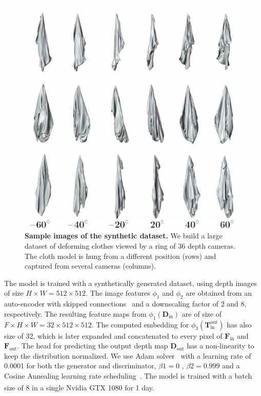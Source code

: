 \begin{figure}
    \centering
    \includegraphics[width=\linewidth]{main/chapter04/data/ipalm_cvpr_grid_dataset_synth.pdf}
    \caption[Sample images of the synthetic dataset]{{\bf Sample images of the synthetic dataset.} We build a large dataset of deforming clothes viewed by a ring of 36 depth cameras. The cloth model is hung from a different position (rows) and captured from several cameras (columns).}
    \label{fig_setup_cameras}
\end{figure}

The model is trained with a synthetically generated dataset, using depth images of size $H \times W = 512 \times 512$. The image features $\phi_1$ and $\phi_2$ are obtained from an auto-encoder with skipped connections~\cite{pix2pix2017} and a downscaling factor of 2 and 8, respectively. The resulting feature maps from $\phi_1(\mathbf{D}_{\textrm{in}})$ are of size of $F\times H \times W = 32 \times 512 \times 512$.%
The computed embedding for $\phi_3(\mathbf{T}_{\textrm{in}}^{\textrm{out}})$ has also size of 32, which is later expanded and concatenated to every pixel of $\mathbf{F}_{\textrm{in}}$ and $\mathbf{F}_{\textrm{out}}$. The head for predicting the output depth map $\mathbf{D}_{\textrm{out}}$ has a non-linearity  to keep the distribution normalized. We use Adam solver~\cite{kingma2017adam} with a learning rate of 0.0001 for both the generator and discriminator, $\beta1 = 0$ , $\beta2 = 0.999$ and a Cosine Annealing learning rate scheduling~\cite{LoshchilovH16a}.  The model is trained with a batch size of 8 in a single Nvidia\textsuperscript{\textregistered} GTX 1080 for 1 day.

